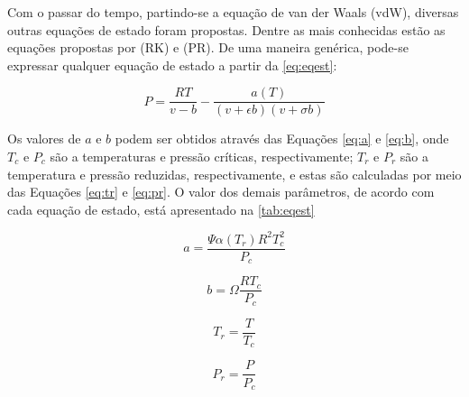 Com o passar do tempo, partindo-se a equação de van der Waals (vdW), diversas
outras equações de estado foram propostas. Dentre as mais conhecidas estão as
equações propostas por  (RK) e 
(PR). De uma maneira genérica, pode-se expressar qualquer equação de estado a
partir da \autoref{eq:eqest}:

\begin{equation}\label{eq:eqest}
P = \frac{RT}{v - b} - \frac{a(T)}{(v + \epsilon b)(v + \sigma b)}
\end{equation}

 Os valores de $a$ e $b$ podem ser obtidos através das Equações \ref{eq:a} e
 \ref{eq:b}, onde $T_c$ e $P_c$ são a temperaturas e pressão críticas,
 respectivamente; $T_r$ e $P_r$ são a temperatura e pressão reduzidas,
 respectivamente, e estas são calculadas por meio das Equações \ref{eq:tr} e
 \ref{eq:pr}. O valor dos demais parâmetros, de acordo com cada equação de
 estado, está apresentado na \autoref{tab:eqest}

\begin{equation}\label{eq:a}
a = \displaystyle\frac{\Psi\alpha(T_r)R^2T_c^2}{P_c}
\end{equation}

\begin{equation}\label{eq:b}
b = \displaystyle\Omega\frac{RT_c}{P_c}
\end{equation}

\begin{equation}\label{eq:tr}
T_r = \displaystyle\frac{T}{T_c}
\end{equation}

\begin{equation}\label{eq:pr}
P_r = \displaystyle\frac{P}{P_c}
\end{equation}

